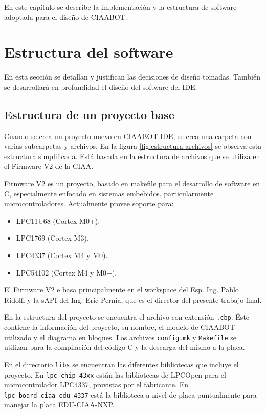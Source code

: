 En este capítulo se describe la implementación y la estructura de software adoptada para el diseño de CIAABOT.
\section{Estructura del software}
En esta sección se detallan y justifican las decisiones de diseño tomadas. También se desarrollará en profundidad el diseño del software del IDE.

\subsection{Estructura de un proyecto base}
\label{subsec:estructura-proyecto}
Cuando se crea un proyecto nuevo en CIAABOT IDE, se crea una carpeta con varias subcarpetas y archivos. En la figura \ref{fig:estructura-archivos} se observa esta estructura simplificada. Está basada en la estructura de archivos que se utiliza en el Firmware V2 de la CIAA.

Firmware V2 es un proyecto, basado en makefile para el desarrollo de software en C, especialmente enfocado en sistemas embebidos, particularmente microcontroladores. Actualmente provee soporte para:

\begin{itemize}
\item LPC11U68 (Cortex M0+).
\item LPC1769 (Cortex M3).
\item LPC4337 (Cortex M4 y M0).
\item LPC54102 (Cortex M4 y M0+).
\end{itemize}

El Firmware V2 e basa principalmente en el workspace del Esp. Ing. Pablo Ridolfi y la sAPI del Ing. Eric Pernía, que es el director del presente trabajo final.

En la estructura del proyecto se encuentra el archivo con extensión \texttt{.cbp}. Éste contiene la información del proyecto, su nombre, el modelo de CIAABOT utilizado y el diagrama en bloques. Los archivos \texttt{config.mk} y \texttt{Makefile} se utilizan para la compilación del código C y la descarga del mismo a la placa.

En el directorio \texttt{libs} se encuentran las diferentes bibliotecas que incluye el proyecto. En \texttt{lpc\_chip\_43xx} están las bibliotecas de LPCOpen para el microcontrolador LPC4337, provistas por el fabricante. En \texttt{lpc\_board\_ciaa\_edu\_4337} está la biblioteca a nivel de placa puntualmente para manejar la placa EDU-CIAA-NXP.

